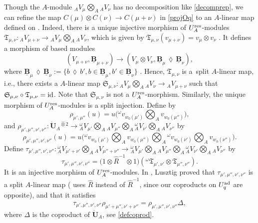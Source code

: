 \documentclass[pdftex]{sigma}
\numberwithin{equation}{section}
\theoremstyle{definition}
\newcommand{\ra}{\rightarrow}
\newcommand{\smallbullet}{%
\vcenter{\hbox{\,\scalebox{0.5}{$\bullet$}\,}}
}
\begin{document}
Though the $A$-module ${}_AV_\mu \bigotimes_A {}_AV_\nu$ has no decomposition like \eqref{decomprep}, we can refine the map $C(\mu) \otimes C(\nu) \ra C(\mu+\nu)$ in \eqref{projOq} to an $A$-linear map defined on \smash{${}_A \overset{\raisebox{-1.5pt}{\scriptsize$\smallbullet$}}{C} (\mu) \bigotimes_A {}_A \overset{\raisebox{-1.5pt}{\scriptsize$\smallbullet$}}{C} (\nu)$}. Indeed, there is a unique injective morphism of $U_A^{\rm res}$-modules $\mathfrak{T}_{\mu,\nu}\colon{}_AV_{\mu+\nu}\ra {}_AV_\mu \bigotimes_A {}_AV_\nu$, which is given by $\mathfrak{T}_{\mu,\nu}(v_{\mu+\nu}) = v_{\mu} \otimes v_{\nu}$ \cite[Proposition 25.1.2\,(a)--(b)]{Lusztig}. It defines a morphism of based modules
\[(V_{\mu+\nu},\underline{\mathbf{B}}_{\mu+\nu}) \ra (V_\mu \otimes V_\nu ,\underline{\mathbf{B}}_{\mu} \,\lozenge\, \underline{\mathbf{B}}_\nu),
\]
where $\underline{\mathbf{B}}_{\mu} \,\lozenge\, \underline{\mathbf{B}}_\nu := \{b\,\lozenge\, b', b\in \underline{\mathbf{B}}_{\mu}, b'\in \underline{\mathbf{B}}_{\nu} \}$ \cite[Proposition~27.1.7]{Lusztig}. Hence, $\mathfrak{T}_{\mu,\nu}$ is a~split $A$-li\-near map, i.e., there exists a $A$-linear map $\mathfrak{S}_{\mu,\nu}\colon {}_AV_\mu \bigotimes_A {}_AV_\nu \ra {}_AV_{\mu+\nu} $ such that ${\mathfrak{S}_{\mu,\nu}\circ \mathfrak{T}_{\mu,\nu} ={\rm id}}$. Note that $\mathfrak{S}_{\mu,\nu}$ is not a $U_A^{\rm res}$-morphism. Similarly, the unique morphism of $U_A^{\rm res}$-modules \smash{${}^\omega\mathfrak{T}_{\mu,\nu}\colon{}_A^\omega V_{\mu+\nu}\ra {}_A^\omega V_\mu \bigotimes_A {}_A^\omega V_\nu$} is a split injection. Define \smash{$\rho_{\mu',\mu''}\colon \dot{\mathbf{U}}_A \ra {}_A^\omega V_{\mu'} \bigotimes_A {}_AV_{\mu''}$} by
\[
\rho_{\mu',\mu''}(u)= u\biggl({}^\omega v_{w_0(\mu')}\bigotimes_A v_{w_0(\mu'')}\biggr),\]
and $\rho_{\mu',\mu'',\nu',\nu''}\colon \dot{\mathbf{U}}_A{}^{ \hat{\otimes}2} \ra {}_A^\omega V_{\mu'} \bigotimes_A {}_AV_{\mu''} \bigotimes_A {}_A^\omega V_{\nu'} \bigotimes_A {}_AV_{\nu''}$ by
\[\rho_{\mu',\mu'',\nu',\nu''}(u)= u\biggl({}^\omega v_{w_0(\mu')}\bigotimes_A v_{w_0(\mu'')}\bigotimes_A {}^\omega v_{w_0(\nu')}\bigotimes_A v_{w_0(\nu'')}\biggr).\]
Define $\tau_{\mu',\mu'',\nu',\nu''}\colon {}_A^\omega V_{\mu'+\nu'} \bigotimes_A {}_AV_{\mu''+\nu''} \ra {}_A^\omega V_{\mu'} \bigotimes_A {}_AV_{\mu''} \bigotimes_A {}_A^\omega V_{\nu'} \bigotimes_A {}_AV_{\nu''}$ by
\[\tau_{\mu',\mu'',\nu',\nu''} = \big(1\otimes \hat{R}^{-1} \otimes 1\big)({}^\omega \mathfrak{T}_{\mu',\nu'} \otimes \mathfrak{T}_{\mu'',\nu''}).\]
It is an injective morphism of $U_A^{\rm res}$-modules. In \cite[Section 1.13]{Lusztig3}, Lusztig proved that $\tau_{\mu',\mu'',\nu',\nu''}$ is a split $A$-linear map (\cite{Lusztig3} uses $\hat{R}$ instead of $\hat{R}^{-1}$, since our coproducts on $U_q^{\rm ad}$ are opposite), and that it satisfies{\samepage
\begin{equation}\label{commutdiagLusztig}
\tau_{\mu',\mu'',\nu',\nu''} \rho_{\mu'+\mu'',\nu'+\nu''} = \rho_{\mu',\mu'',\nu',\nu''}\Delta,
\end{equation}
where $\Delta$ is the coproduct of $\dot{\mathbf{U}}_A$, see \eqref{defcoprod}.}
\end{document}
